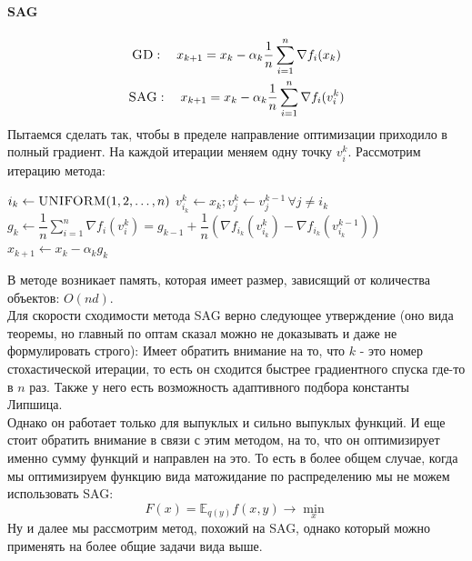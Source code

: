 \paragraph{SAG}
\begin{gather*}
    \textsc{GD}: \quad x_{k+1} = x_k - \alpha_k \dfrac{1}{n} \sum\limits_{i=1}^{n} \nabla f_i (x_k) \\
    \textsc{SAG}: \quad x_{k+1} = x_k - \alpha_k \dfrac{1}{n} \sum\limits_{i=1}^{n} \nabla f_i (v_i^k)
\end{gather*}
Пытаемся сделать так, чтобы в пределе направление оптимизации приходило в полный градиент. На каждой итерации меняем одну точку $v_i^k$. Рассмотрим итерацию метода:
\begin{algorithmic}[1]
        \State $i_k \gets \textsc{UNIFORM}(1, 2, \dots , n)$
        \State $v_{i_k}^k \gets x_k; v_{j}^k \gets v_{j}^{k-1} \, \forall j \neq i_k $
        \State $g_k \gets \dfrac{1}{n} \sum\limits_{i=1}^{n} \nabla f_i (v_i^k) = g_{k-1} + \dfrac{1}{n} \left(\nabla f_{i_k}(v_{i_k}^k) - \nabla f_{i_k}(v_{i_k}^{k-1})\right)$
        \State $x_{k+1} \gets x_k - \alpha_k g_k$
    \EndProcedure
\end{algorithmic}
В методе возникает память, которая имеет размер, зависящий от количества объектов: $O(nd)$. \\
Для скорости сходимости метода SAG верно следующее утверждение (оно вида теоремы, но главный по оптам сказал можно не доказывать и даже не формулировать строго):
Имеет обратить внимание на то, что $k$ - это номер стохастической итерации, то есть он сходится быстрее градиентного спуска где-то в $n$ раз. Также у него есть возможность адаптивного подбора константы Липшица.\\
Однако он работает только для выпуклых и сильно выпуклых функций. И еще стоит обратить внимание в связи с этим методом, на то, что он оптимизирует именно сумму функций и направлен на это. То есть в более общем случае, когда мы оптимизируем функцию вида матожидание по распределению мы не можем использовать SAG:
\[
    F(x) = \mathbb{E}_{q(y)} f(x, y) \to \min\limits_{x}
\]
Ну и далее мы рассмотрим метод, похожий на SAG, однако который можно применять на более общие задачи вида выше.

